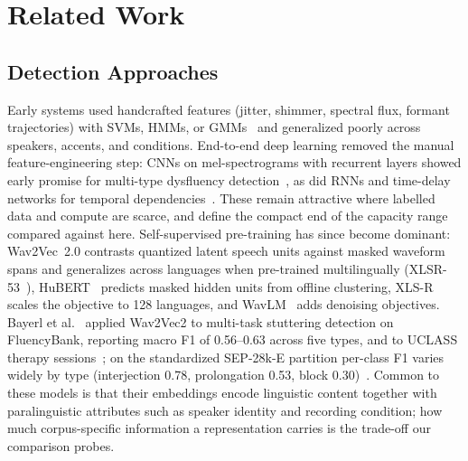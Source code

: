 \documentclass[a4paper,orivec]{llncs}
\begin{document}
\section{Related Work}
\label{sec:related}

\subsection{Detection Approaches}
Early systems used handcrafted features (jitter, shimmer, spectral flux, formant
trajectories) with SVMs, HMMs, or GMMs~\cite{sheikh2022review} and generalized
poorly across speakers, accents, and conditions. End-to-end deep learning removed
the manual feature-engineering step: CNNs on mel-spectrograms with recurrent
layers showed early promise for multi-type dysfluency
detection~\cite{kourkounakis2020detecting}, as did RNNs and time-delay networks
for temporal dependencies~\cite{sheikh2021stutternet}. These remain attractive
where labelled data and compute are scarce, and define the compact end of the
capacity range compared against here. Self-supervised pre-training has since
become dominant: Wav2Vec~2.0 contrasts quantized latent speech units against
masked waveform spans and generalizes across languages when pre-trained
multilingually (XLSR-53~\cite{conneau2021xlsr}), HuBERT~\cite{hsu2021hubert}
predicts masked hidden units from offline clustering, XLS-R~\cite{babu2022xlsr}
scales the objective to 128 languages, and WavLM~\cite{chen2022wavlm} adds
denoising objectives. Bayerl et al.~\cite{bayerl2022multi} applied Wav2Vec2 to
multi-task stuttering detection on FluencyBank, reporting macro F1 of 0.56--0.63
across five types, and to UCLASS therapy sessions~\cite{bayerl2022therapy}; on
the standardized SEP-28k-E partition per-class F1 varies widely by type
(interjection 0.78, prolongation 0.53, block 0.30)~\cite{susac2026stuttmil}.
Common to these models is that their embeddings encode linguistic content together
with paralinguistic attributes such as speaker identity and recording condition;
how much corpus-specific information a representation carries is the trade-off
our comparison probes.
\end{document}

